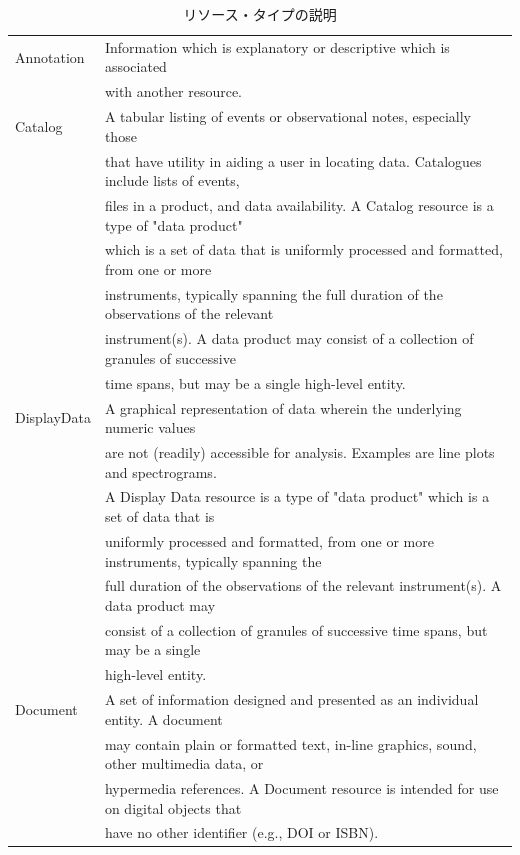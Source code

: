 \begin{table}[H]
\begin{center}
\caption{リソース・タイプの説明}
\begin{tabular}{ll}\hline
Annotation & Information which is explanatory or descriptive which is associated \\
 & with another resource.\\
Catalog & A tabular listing of events or observational notes, especially those \\
 & that have utility in aiding a user in locating data. Catalogues include lists of events, \\
 & files in a product, and data availability. A Catalog resource is a type of "data product" \\
 & which is a set of data that is uniformly processed and formatted, from one or more \\
 & instruments, typically spanning the full duration of the observations of the relevant \\ 
 & instrument(s). A data product may consist of a collection of granules of successive \\
 & time spans, but may be a single high-level entity.\\
DisplayData & A graphical representation of data wherein the underlying numeric values \\
 & are not (readily) accessible for analysis. Examples are line plots and spectrograms. \\
 & A Display Data resource is a type of "data product" which is a set of data that is \\ 
 & uniformly processed and formatted, from one or more instruments, typically spanning the \\
 & full duration of the observations of the relevant instrument(s). A data product may \\
 & consist of a collection of granules of successive time spans, but may be a single \\ 
 & high-level entity.\\
Document & A set of information designed and presented as an individual entity. A document \\
 & may contain plain or formatted text, in-line graphics, sound, other multimedia data, or \\
 & hypermedia references. A Document resource is intended for use on digital objects that \\
 & have no other identifier (e.g., DOI or ISBN).\\

\end{tabular}
\end{center}
\end{table}

